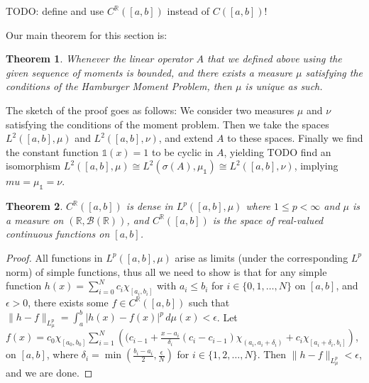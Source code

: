 \documentclass[12pt,oneside]{report}
\newtheorem{thm}{Theorem}[chapter]
\begin{document}
TODO: define and use $C^{\mathbb{R}}([a,b])$ instead of $C([a,b])$!
 
Our main theorem for this section is:

\begin{thm}
    Whenever the linear operator $A$ that we defined above using the given sequence of moments is bounded, and there exists a measure $\mu$ satisfying the conditions of the Hamburger Moment Problem, then $\mu$ is unique as such.
\end{thm}

The sketch of the proof goes as follows: We consider two measures $\mu$ and $\nu$ satisfying the conditions of the moment problem. Then we take the spaces $L^{2}([a,b], \mu)$ and $L^{2}([a,b], \nu)$, and extend $A$ to these spaces. Finally we find the constant function $\mathds{1}(x) = 1$ to be cyclic in $A$, yielding TODO find an isomorphism $L^{2}([a,b], \mu) \cong L^2(\sigma(A), \mu_\mathds{1}) \cong L^{2}([a,b], \nu)$, implying $mu = \mu_\mathds{1} = \nu$.


\begin{thm}
    $C^{\mathbb{R}}([a,b])$ is dense in $L^{p}([a,b], \mu)$ where $1 \leq p <\infty$ and $\mu$ is a measure on $(\mathbb{R},\mathcal{B}(\mathbb{R}))$, and $C^{\mathbb{R}}([a,b])$ is the space of real-valued continuous functions on $[a,b]$.
\end{thm}
\begin{proof}
    All functions in $L^{p}([a,b],\mu)$ arise as limits (under the corresponding $L^{p}$ norm) of simple functions, thus all we need to show is that for any simple function $h(x) = \sum_{i=0}^{N}c_{i}\chi_{[a_{i},b_{i}]}$ with $a_{i} \leq b_{i}$ for $i \in \{ 0,1,\dots,N \}$ on $[a,b]$, and $\epsilon > 0$, there exists some $f \in C^{\mathbb{R}}([a,b])$ such that $\|h - f\|_{L^{p}_{\mu}} = \int _{a}^{b} |h(x) - f(x)|^{p} \, d\mu(x) < \epsilon$. Let $f(x) = c_{0}\chi_{[a_{0},b_{0}]} \sum_{i=1}^{N} \left( (c_{i-1} + \frac{x - a_{i}}{\delta_{i}}(c_{i} - c_{i-1})\chi_{(a_{i},a_{i}+\delta_{i})} + c_{i}\chi_{\left[ a_{i} + \delta_{i}, b_{i} \right]} \right)$, on $[a,b]$, where $\delta_{i} = \min\left( \frac{b_{i} - a_{i}}{2}, \frac{\epsilon}{N} \right)$ for $i \in \{ 1,2,\dots,N \}$. Then $\|h - f\|_{L^{p}_{\mu}} < \epsilon$, and we are done.
\end{proof}
\end{document}
